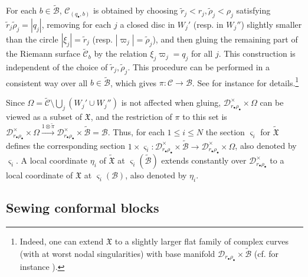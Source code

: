\documentclass[12pt,a4paper,notitlepage]{article}
\theoremstyle{definition}
\theoremstyle{plain}
\newcommand{\fk}{\mathfrak}
\newcommand{\mc}{\mathcal}
\newcommand{\wtd}{\widetilde}
\newcommand{\sgm}{\varsigma}
\newcommand{\blt}{\bullet}
\numberwithin{equation}{section}
\begin{document}
For each $b\in\wtd{\mc B}$, $\mc C_{(q_\blt,b)}$ is obtained by choosing $\wtd r_j<r_j,\wtd\rho_j<\rho_j$ satisfying $\wtd r_j\wtd \rho_j=|q_j|$, removing for each $j$ a closed disc in $W_j'$ (resp. in $W_j''$) slightly smaller than the circle $|\xi_j|=\wtd r_j$ (resp. $|\varpi_j|=\wtd\rho_j$), and then gluing the remaining part of the Riemann surface $\wtd {\mc C}_b$ by the relation $\xi_j\varpi_j=q_j$ for all $j$. This construction is independent of the choice of $\wtd r_j,\wtd \rho_j$.  This procedure can be performed in a consistent way over all $b\in\wtd{\mc B}$, which gives $\pi:\mc C\rightarrow\mc B$. See for instance \cite[Sec. 4]{Gui20} for details.\footnote{Indeed,  one can extend $\fk X$ to a slightly larger flat family of complex curves (with at worst nodal singularities) with base manifold $\mc D_{r_\blt\rho_\blt}\times\wtd{\mc B}$ (cf. for instance \cite[Sec. 4]{Gui20}).} 

Since $\Omega=\wtd{\mc C}\setminus \bigcup_j(W_j'\cup W_j'')$ is not affected when gluing, $\mc D_{r_\blt\rho_\blt}^\times\times\Omega$ can be viewed as a subset of $\fk X$, and the restriction of $\pi$ to this set is $\mc D_{r_\blt\rho_\blt}^\times\times\Omega\xrightarrow{1\otimes\wtd\pi}\mc D_{r_\blt\rho_\blt}^\times\times\wtd{\mc B}=\mc B$. Thus, for each $1\leq i\leq N$ the section $\sgm_i$ for $\wtd{\fk X}$  defines the corresponding section $1\times\sgm_i:\mc D_{r_\blt\rho_\blt}^\times\times\wtd{\mc B}\rightarrow \mc D_{r_\blt\rho_\blt}^\times\times\Omega$, also denoted by $\sgm_i$. A local coordinate $\eta_i$ of $\wtd{\fk X}$ at $\sgm_i(\wtd{\mc B})$ extends constantly over $\mc D_{r_\blt\rho_\blt}^\times$ to a local coordinate of $\fk X$ at $\sgm_i(\mc B)$, also denoted by $\eta_i$.





	
\subsection*{Sewing conformal blocks}
	
\end{document}
